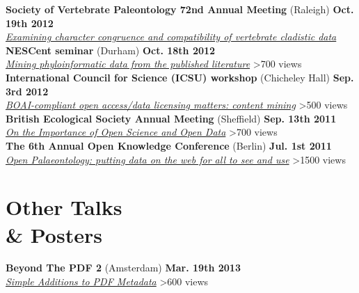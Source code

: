 \documentclass[margin,line]{resume}
\begin{document}
\begin{resume}
\vspace{-7 mm}     
\textbf{Society of Vertebrate Paleontology 72nd Annual Meeting} (Raleigh) \hfill \textbf{Oct. 19th 2012}\\
    \textsl{\href{http://prezi.com/4vwe4togkazh/svp2012/}{Examining character congruence and compatibility of vertebrate cladistic data}} \\ 

\vspace{-7 mm} 
\textbf{NESCent seminar} (Durham) \hfill \textbf{Oct. 18th 2012}\\
    \textsl{\href{http://prezi.com/k0xq0fmcfu7x/nescent-seminar-on-open-content-mining-for-phyloinformatic-data/}{Mining phyloinformatic data from the published literature}} \hfill {\color{red} 		\textgreater 700 views}\\

\vspace{-7 mm} 
 \textbf{International Council for Science (ICSU) workshop} (Chicheley Hall) \hfill \textbf{Sep. 3rd 2012}\\
    \textsl{\href{http://prezi.com/pdq4v-hhcc_2/boai-compliant-open-access-content-mining/}{BOAI-compliant open access/data licensing matters: content mining}} \hfill {\color{red} 		\textgreater 500 views}\\

\vspace{-7 mm}
     \textbf{British Ecological Society Annual Meeting} (Sheffield) \hfill \textbf{Sep. 13th 2011}\\
    \textsl{\href{http://prezi.com/jpr3ltvez2d8/on-the-importance-of-open-science-and-open-data/}{On the Importance of Open Science and Open Data}} \hfill {\color{red} 		\textgreater 700 views}\\

\vspace{-7 mm} 
    \textbf{The 6th Annual Open Knowledge Conference} (Berlin) \hfill \textbf{Jul. 1st 2011}\\
    \textsl{\href{http://prezi.com/d9yztcafx_ag/open-palaeontology/}{Open Palaeontology: putting data on the web for all to see and use}} \hfill {\color{red} 		\textgreater 1500 views}
\newpage
    \section{\mysidestyle Other Talks\\ \&  Posters}
 \textbf{Beyond The PDF 2} (Amsterdam) \hfill \textbf{Mar. 19th 2013}\\
    \textsl{\href{http://www.slideshare.net/rossmounce/simple-additions-to-metadata}{Simple Additions to PDF Metadata}} \hfill {\color{red} 		\textgreater 600 views}\\


\end{resume}
\end{document}
